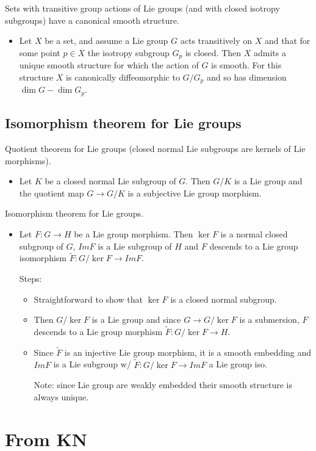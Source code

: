 \documentclass{report}
\theoremstyle{definition}
\begin{document}
Sets with transitive group actions of Lie groups (and with closed isotropy subgroups) have a canonical smooth structure.
\begin{itemize}
    \item Let $X$ be a set, and assume a Lie group $G$ acts transitively on $X$ and that for some point $p\in X$ the isotropy subgroup $G_p$ is closed. Then $X$ admits a unique smooth structure for which the action of $G$ is smooth. For this structure $X$ is canonically diffeomorphic to $G/G_p$ and so has dimension $\dim G-\dim G_p$.
\end{itemize}

\subsection{Isomorphism theorem for Lie groups}

Quotient theorem for Lie groups (closed normal Lie subgroups are kernels of Lie morphisms).
\begin{itemize}
    \item Let $K$ be a closed normal Lie subgroup of $G$. Then $G/K$ is a Lie group and the quotient map $G\to G/K$ is a subjective Lie group morphism.
\end{itemize}

Isomorphism theorem for Lie groups.
\begin{itemize}
    \item Let $F:G\to H$ be a Lie group morphism. Then $\ker F$ is a normal closed subgroup of $G$, $Im F$ is a Lie subgroup of $H$ and $F$ descends to a Lie group isomorphism $\tilde{F}:G/\ker F\to Im F$.

    Steps:
    \begin{itemize}
        \item Straightforward to show that $\ker F$ is a closed normal subgroup.
        \item Then $G/\ker F$ is a Lie group and since $G\to G/\ker F$ is a submersion, $F$ descends to a Lie group morphism $\tilde{F}:G/\ker F\to H$.
        \item Since $\tilde{F}$ is an injective Lie group morphism, it is a smooth embedding and $Im F$ is a Lie subgroup w/ $\tilde{F}:G/\ker F\to Im F$ a Lie group iso.

        Note: since Lie group are weakly embedded their smooth structure is always unique.
    \end{itemize}
\end{itemize}

\section{From KN}
\end{document}

